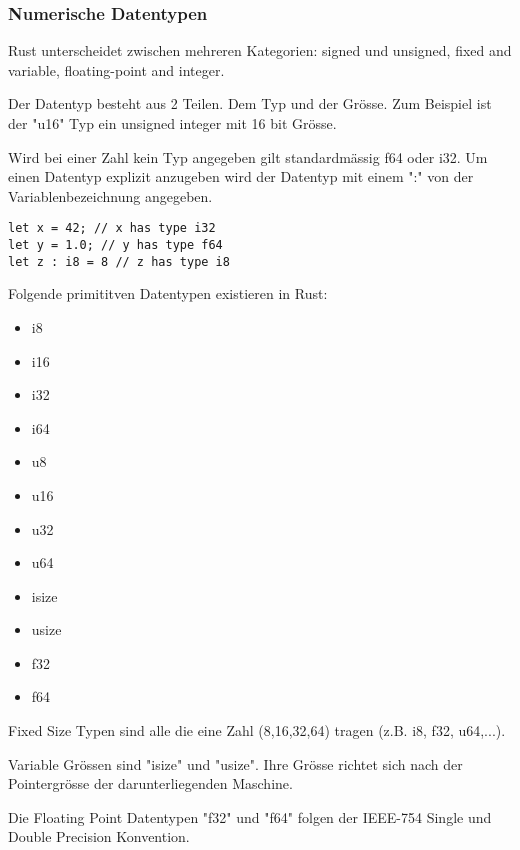 \subsubsection{Numerische Datentypen}
Rust unterscheidet zwischen mehreren Kategorien: signed und unsigned, fixed and variable, floating-point and integer.

Der Datentyp besteht aus 2 Teilen. Dem Typ und der Grösse.
Zum Beispiel ist der "u16" Typ ein unsigned integer mit 16 bit Grösse.

Wird bei einer Zahl kein Typ angegeben gilt standardmässig f64 oder i32. Um einen Datentyp explizit anzugeben wird der Datentyp mit einem ":" von der Variablenbezeichnung angegeben.

\begin{lstlisting}
let x = 42; // x has type i32
let y = 1.0; // y has type f64
let z : i8 = 8 // z has type i8
\end{lstlisting}

Folgende primititven Datentypen existieren in Rust: 
\begin{itemize}
\item i8
\item i16
\item i32
\item i64
\item u8
\item u16
\item u32
\item u64
\item isize
\item usize
\item f32
\item f64
\end{itemize}

Fixed Size Typen sind alle die eine Zahl (8,16,32,64) tragen (z.B. i8, f32, u64,...).

Variable Grössen sind "isize" und "usize". Ihre Grösse richtet sich nach der Pointergrösse der darunterliegenden Maschine.

Die Floating Point Datentypen "f32" und "f64" folgen der  IEEE-754 Single und Double Precision Konvention.